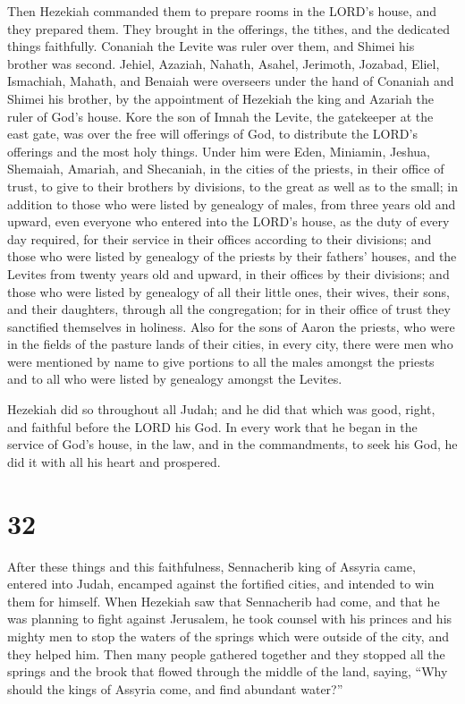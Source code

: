  Then Hezekiah commanded them to prepare rooms in the
LORD's house, and they prepared them.  They brought in
the offerings, the tithes, and the dedicated things faithfully. Conaniah
the Levite was ruler over them, and Shimei his brother was second.
 Jehiel, Azaziah, Nahath, Asahel, Jerimoth, Jozabad,
Eliel, Ismachiah, Mahath, and Benaiah were overseers under the hand of
Conaniah and Shimei his brother, by the appointment of Hezekiah the king
and Azariah the ruler of God's house.  Kore the son of
Imnah the Levite, the gatekeeper at the east gate, was over the free
will offerings of God, to distribute the LORD's offerings and the most
holy things.  Under him were Eden, Miniamin, Jeshua,
Shemaiah, Amariah, and Shecaniah, in the cities of the priests, in their
office of trust, to give to their brothers by divisions, to the great as
well as to the small;  in addition to those who were
listed by genealogy of males, from three years old and upward, even
everyone who entered into the LORD's house, as the duty of every day
required, for their service in their offices according to their
divisions;  and those who were listed by genealogy of the
priests by their fathers' houses, and the Levites from twenty years old
and upward, in their offices by their divisions;  and
those who were listed by genealogy of all their little ones, their
wives, their sons, and their daughters, through all the congregation;
for in their office of trust they sanctified themselves in holiness.
 Also for the sons of Aaron the priests, who were in the
fields of the pasture lands of their cities, in every city, there were
men who were mentioned by name to give portions to all the males amongst
the priests and to all who were listed by genealogy amongst the Levites.

 Hezekiah did so throughout all Judah; and he did that
which was good, right, and faithful before the LORD his God.
 In every work that he began in the service of God's
house, in the law, and in the commandments, to seek his God, he did it
with all his heart and prospered.

\hypertarget{section-31}{%
\section{32}\label{section-31}}

 After these things and this faithfulness, Sennacherib
king of Assyria came, entered into Judah, encamped against the fortified
cities, and intended to win them for himself.  When
Hezekiah saw that Sennacherib had come, and that he was planning to
fight against Jerusalem,  he took counsel with his princes
and his mighty men to stop the waters of the springs which were outside
of the city, and they helped him.  Then many people
gathered together and they stopped all the springs and the brook that
flowed through the middle of the land, saying, ``Why should the kings of
Assyria come, and find abundant water?''

